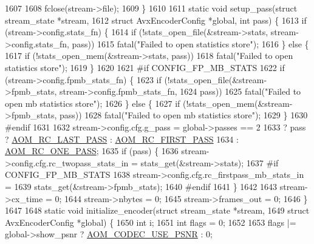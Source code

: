 \begin{DoxyCodeInclude}
{{{{{{{{{{{{{{{{{{{{{{{{{{{{{{{{{{{{1607 
1608   fclose(stream->file);
1609 \}
1610 
1611 \textcolor{keyword}{static} \textcolor{keywordtype}{void} setup\_pass(\textcolor{keyword}{struct} stream\_state *stream,
1612     \textcolor{keyword}{struct} AvxEncoderConfig *global, \textcolor{keywordtype}{int} pass) \{
1613   \textcolor{keywordflow}{if} (stream->config.stats\_fn) \{
1614     \textcolor{keywordflow}{if} (!stats\_open\_file(&stream->stats, stream->config.stats\_fn, pass))
1615       fatal(\textcolor{stringliteral}{"Failed to open statistics store"});
1616   \} \textcolor{keywordflow}{else} \{
1617     \textcolor{keywordflow}{if} (!stats\_open\_mem(&stream->stats, pass))
1618       fatal(\textcolor{stringliteral}{"Failed to open statistics store"});
1619   \}
1620 
1621 \textcolor{preprocessor}{#if CONFIG\_FP\_MB\_STATS}
1622   \textcolor{keywordflow}{if} (stream->config.fpmb\_stats\_fn) \{
1623     \textcolor{keywordflow}{if} (!stats\_open\_file(&stream->fpmb\_stats, stream->config.fpmb\_stats\_fn,
1624         pass))
1625       fatal(\textcolor{stringliteral}{"Failed to open mb statistics store"});
1626   \} \textcolor{keywordflow}{else} \{
1627     \textcolor{keywordflow}{if} (!stats\_open\_mem(&stream->fpmb\_stats, pass))
1628       fatal(\textcolor{stringliteral}{"Failed to open mb statistics store"});
1629   \}
1630 \textcolor{preprocessor}{#endif}
1631 
1632   stream->config.cfg.g\_pass = global->passes == 2
1633       ? pass ? \hyperlink{group__encoder_gga92b6709b58dc3435e3ba652da562eda1a621c3f07937527618dc06e962425f6cc}{AOM\_RC\_LAST\_PASS} : \hyperlink{group__encoder_gga92b6709b58dc3435e3ba652da562eda1ad342b33a290482c20238bfde5d9bea1e}{AOM\_RC\_FIRST\_PASS}
1634           : \hyperlink{group__encoder_gga92b6709b58dc3435e3ba652da562eda1a1b4b8ee9c1910fc59ac9dfd9700f3f02}{AOM\_RC\_ONE\_PASS};
1635   \textcolor{keywordflow}{if} (pass) \{
1636     stream->config.cfg.rc\_twopass\_stats\_in = stats\_get(&stream->stats);
1637 \textcolor{preprocessor}{#if CONFIG\_FP\_MB\_STATS}
1638     stream->config.cfg.rc\_firstpass\_mb\_stats\_in =
1639         stats\_get(&stream->fpmb\_stats);
1640 \textcolor{preprocessor}{#endif}
1641   \}
1642 
1643   stream->cx\_time = 0;
1644   stream->nbytes = 0;
1645   stream->frames\_out = 0;
1646 \}
1647 
1648 \textcolor{keyword}{static} \textcolor{keywordtype}{void} initialize\_encoder(\textcolor{keyword}{struct} stream\_state *stream,
1649     \textcolor{keyword}{struct} AvxEncoderConfig *global) \{
1650   \textcolor{keywordtype}{int} i;
1651   \textcolor{keywordtype}{int} flags = 0;
1652 
1653   flags |= global->show\_psnr ? \hyperlink{group__encoder_gae722c9f9ba9b4ca8dba6bbe7c0692024}{AOM\_CODEC\_USE\_PSNR} : 0;
}}}}}}}}}}}}}}}}}}}}}}}}}}}}}}}}}}}}
\end{DoxyCodeInclude}
